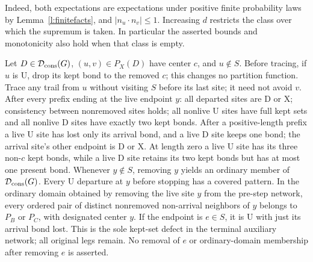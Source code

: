 Indeed, both expectations are expectations under positive finite
probability laws by Lemma~\ref{l:finitefacts}, and
\(|n_u\cdot n_v|\le1\).  Increasing \(d\) restricts the class over
which the supremum is taken.  In particular the asserted bounds and
monotonicity also hold when that class is empty.

\begin{lemma}\label{l:closure}
Let \(D\in\mathcal D_{\rm cons}(G)\), \((u,v)\in P_X(D)\) have
center \(c\), and \(u\notin S\). Before tracing, if \(u\) is
\(\mathrm U\), drop its kept bond to the removed \(c\); this changes
no partition function. Trace any trail from \(u\) without visiting
\(S\) before its last site; it need not avoid \(v\).
After every prefix ending at the live endpoint \(y\):
all departed sites are \(\mathrm D\) or \(\mathrm X\);
consistency between nonremoved sites holds; all nonlive
\(\mathrm U\) sites have full kept sets and all nonlive \(\mathrm D\)
sites have exactly two kept bonds.
After a positive-length prefix a live \(\mathrm U\) site has lost
only its arrival bond, and a live \(\mathrm D\) site keeps one bond;
the arrival site's other endpoint is \(\mathrm D\) or \(\mathrm X\).
At length zero a live \(\mathrm U\) site has its three non-\(c\)
kept bonds, while a live \(\mathrm D\) site retains its two kept
bonds but has at most one present bond.
Whenever \(y\notin S\), removing \(y\) yields an ordinary member
of \(\mathcal D_{\rm cons}(G)\). Every \(\mathrm U\) departure
at \(y\) before stopping has a covered pattern. In the ordinary
domain obtained by removing the live site \(y\) from the pre-step
network, every ordered pair of distinct nonremoved non-arrival
neighbors of \(y\) belongs to \(P_B\) or \(P_C\), with designated
center \(y\).
If the endpoint is \(e\in S\), it is \(\mathrm U\) with just its
arrival bond lost. This is the sole kept-set defect in the terminal
auxiliary network; all original legs remain. No removal of \(e\)
or ordinary-domain membership after removing \(e\) is asserted.
\end{lemma}

